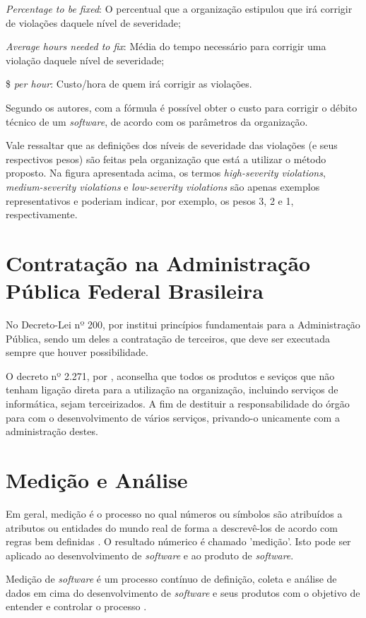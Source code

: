 \textit{Percentage to be fixed}: O percentual que a organização estipulou que irá corrigir
de violações daquele nível de severidade;

\textit{Average hours needed to fix}: Média do tempo necessário para corrigir uma violação
daquele nível de severidade;

\$ \textit{per hour}: Custo/hora de quem irá corrigir as violações.

Segundo os autores, com a fórmula é possível obter o custo para corrigir o débito
técnico de um \textit{software}, de acordo com os parâmetros da organização.

Vale ressaltar que as definições dos níveis de severidade das violações (e seus respectivos pesos) são feitas pela organização que está a utilizar o método proposto.
Na figura apresentada acima, os termos \textit{high-severity violations}, \textit{medium-severity violations} e \textit{low-severity violations} são apenas exemplos representativos e poderiam indicar, por exemplo, os pesos 3, 2 e 1, respectivamente.

\section{Contratação na Administração Pública Federal Brasileira}

No Decreto-Lei nº 200, \cite{decreto200} por institui princípios fundamentais para a
Administração Pública, sendo um deles a contratação de terceiros, que deve ser
executada sempre que houver possibilidade.

O decreto nº 2.271, por \cite{decreto2271}, aconselha que todos os produtos e seviços
que não tenham ligação direta para a utilização na organização, incluindo serviços
de informática, sejam terceirizados. A fim de destituir a responsabilidade do
órgão para com o desenvolvimento de vários serviços, privando-o unicamente com
a administração destes.

\section{Medição e Análise}
Em geral, medição é o processo no qual números ou símbolos são atribuídos a
atributos ou entidades do mundo real de forma a descrevê-los de acordo com regras
bem definidas \cite{fentonpfleeger}. O resultado númerico é chamado 'medição'.
Isto pode ser aplicado ao desenvolvimento de \textit{software} e ao produto de \textit{software}.

Medição de \textit{software} é um processo contínuo de definição, coleta e análise de
dados em cima do desenvolvimento de \textit{software} e seus produtos com o objetivo de
entender e controlar o processo \cite{egon}.


